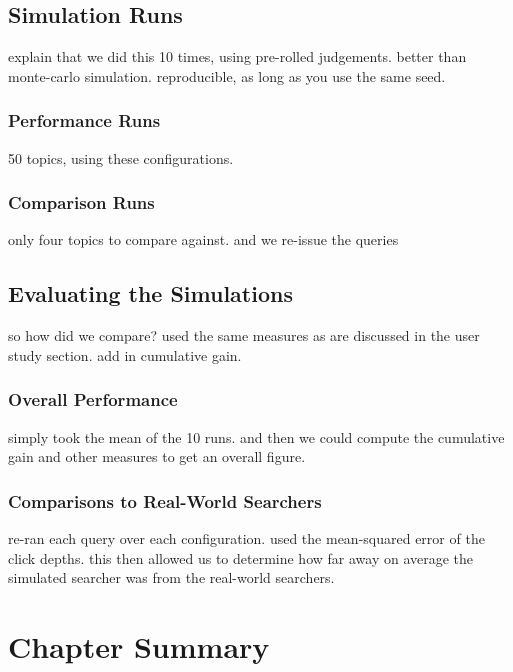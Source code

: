 \subsection{Simulation Runs}

explain that we did this 10 times, using pre-rolled judgements.
better than monte-carlo simulation.
reproducible, as long as you use the same seed.

\subsubsection{Performance Runs}

50 topics, using these configurations.

\subsubsection{Comparison Runs}

only four topics to compare against. and we re-issue the queries

\subsection{Evaluating the Simulations}\label{chap:csm:method:evaluation}

so how did we compare? used the same measures as are discussed in the user study section.
add in cumulative gain.

\subsubsection{Overall Performance}

simply took the mean of the 10 runs. and then we could compute the cumulative gain and other measures to get an overall figure.

\subsubsection{Comparisons to Real-World Searchers}

re-ran each query over each configuration.
used the mean-squared error of the click depths.
this then allowed us to determine how far away on average the simulated searcher was from the real-world searchers.

\section{Chapter Summary}



